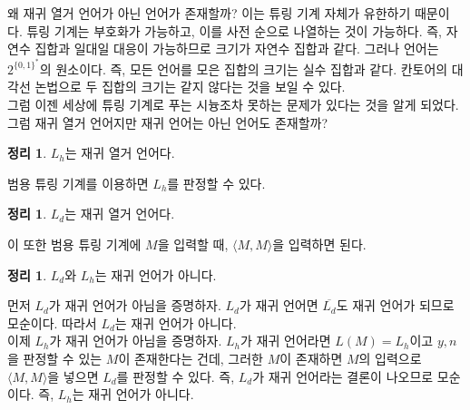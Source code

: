 \documentclass[b5paper, 11pt]{book}
\theoremstyle{definition}
\newtheorem{thm}[defn]{정리}
\newenvironment{pf*}{\pushQED{\qed}\pf}
{\popQED\endpf}
\begin{document}
왜 재귀 열거 언어가 아닌 언어가 존재할까? 이는 튜링 기계 자체가 유한하기 때문이다. 튜링 기계는 부호화가 가능하고, 이를 사전 순으로 나열하는 것이 가능하다. 즉, 자연수 집합과 일대일 대응이 가능하므로 크기가 자연수 집합과 같다. 그러나 언어는 $2^{\{0,1\}^*}$의 원소이다. 즉, 모든 언어를 모은 집합의 크기는 실수 집합과 같다. 칸토어의 대각선 논법으로 두 집합의 크기는 같지 않다는 것을 보일 수 있다. \\
그럼 이젠 세상에 튜링 기계로 푸는 시늉조차 못하는 문제가 있다는 것을 알게 되었다. 그럼 재귀 열거 언어지만 재귀 언어는 아닌 언어도 존재할까?
\begin{thm}
    $L_h$는 재귀 열거 언어다.
\end{thm}
\begin{pf*}
    범용 튜링 기계를 이용하면 $L_h$를 판정할 수 있다.
\end{pf*}
\begin{thm}
    $L_d$는 재귀 열거 언어다. 
\end{thm}
\begin{pf*}
    이 또한 범용 튜링 기계에 $M$을 입력할 때, $\langle M, M \rangle$을 입력하면 된다.
\end{pf*}
\begin{thm}
    $L_d$와 $L_h$는 재귀 언어가 아니다.
\end{thm}
\begin{pf*}
    먼저 $L_d$가 재귀 언어가 아님을 증명하자. $L_d$가 재귀 언어면 $\overline{L_d}$도 재귀 언어가 되므로
    모순이다. 따라서 $L_d$는 재귀 언어가 아니다. \\ 
    이제 $L_h$가 재귀 언어가 아님을 증명하자. $L_h$가 재귀 언어라면 $L(M) = L_h$이고
    $y, n$을 판정할 수 있는 $M$이 존재한다는 건데, 그러한 $M$이 존재하면 $M$의 입력으로
    $\langle M, M \rangle$을 넣으면 $L_d$를 판정할 수 있다. 즉, $L_d$가 재귀 언어라는
    결론이 나오므로 모순이다. 즉, $L_h$는 재귀 언어가 아니다.
\end{pf*}
\end{document}
